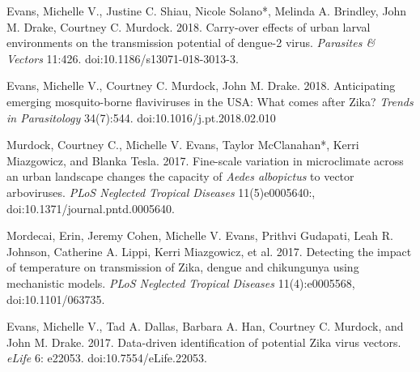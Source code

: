 \begin{etaremune}
\item \textcolor{awesome}{Evans, Michelle V.}, Justine C. Shiau, Nicole Solano*, Melinda A. Brindley, John M. Drake, Courtney C. Murdock. 2018. Carry-over effects of urban larval environments on the transmission potential of dengue-2 virus. \textit{Parasites \& Vectors} 11:426. doi:10.1186/s13071-018-3013-3.

\item \textcolor{awesome}{Evans, Michelle V.}, Courtney C. Murdock, John M. Drake. 2018. Anticipating emerging mosquito-borne flaviviruses in the USA: What comes after Zika? \textit{Trends in Parasitology} 34(7):544. \linebreak doi:10.1016/j.pt.2018.02.010

\item Murdock, Courtney C., \textcolor{awesome}{Michelle V. Evans}, Taylor McClanahan*, Kerri Miazgowicz, and Blanka Tesla. 2017. Fine-scale variation in microclimate across an urban landscape changes the capacity of \textit{Aedes albopictus} to vector arboviruses. \textit{PLoS Neglected Tropical Diseases} 11(5)e0005640:, \linebreak doi:10.1371/journal.pntd.0005640.
\smallskip

\item Mordecai, Erin, Jeremy Cohen, \textcolor{awesome}{Michelle V. Evans}, Prithvi Gudapati, Leah R. Johnson, Catherine A. Lippi, Kerri Miazgowicz, et al. 2017. Detecting the impact of temperature on transmission of Zika, dengue and chikungunya using mechanistic models. \textit{PLoS Neglected Tropical Diseases} 11(4):e0005568, \linebreak doi:10.1101/063735.
\smallskip

\item \textcolor{awesome}{Evans, Michelle V.}, Tad A. Dallas, Barbara A. Han, Courtney C. Murdock, and John M. Drake. 2017. Data-driven identification of potential Zika virus vectors. \textit{eLife} 6: e22053. doi:10.7554/eLife.22053.

\end{etaremune}

\bigskip
